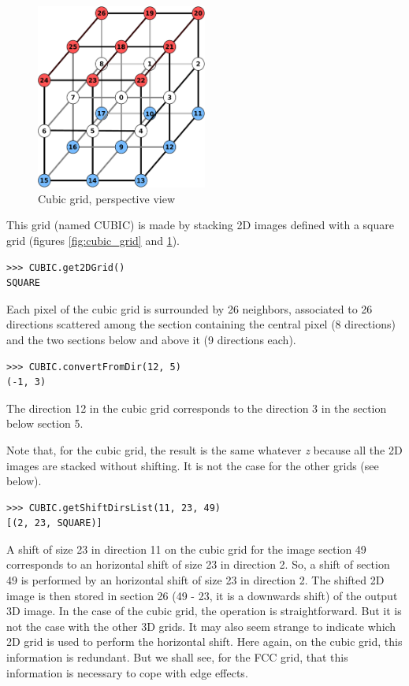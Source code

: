 \documentclass[a4paper,10pt,oneside]{article}
\begin{document}
\begin{figure}
\centering
\includegraphics[width=0.5\textwidth]{figures/Cubic_grid_3D.pdf}
\caption{Cubic grid, perspective view}
\label{fig:cubic_grid_3D}
\end{figure}


This grid (named CUBIC) is made by stacking 2D images defined with a square grid (figures \ref{fig:cubic_grid} and \ref{fig:cubic_grid_3D}).

\lstset{language=Python}
\begin{lstlisting}
>>> CUBIC.get2DGrid()
SQUARE
\end{lstlisting}

Each pixel of the cubic grid is surrounded by 26 neighbors, associated to 26 directions scattered among the section containing the
central pixel (8 directions) and the two sections below and above it (9 directions each).

\lstset{language=Python}
\begin{lstlisting}
>>> CUBIC.convertFromDir(12, 5)
(-1, 3)
\end{lstlisting}

The direction 12 in the cubic grid corresponds to the direction 3 in the section below section 5.

Note that, for the cubic grid, the result is the same whatever \emph{z} because all the 2D images are stacked without shifting. It is
not the case for the other grids (see below).

\lstset{language=Python}
\begin{lstlisting}
>>> CUBIC.getShiftDirsList(11, 23, 49)
[(2, 23, SQUARE)]
\end{lstlisting}
 
A shift of size 23 in direction 11 on the cubic grid for the image section 49 corresponds to an horizontal shift of size 23 in
direction 2. So, a shift of section 49 is performed by an horizontal shift of size 23 in direction 2. The shifted 2D image is then stored
in section 26 (49 - 23, it is a downwards shift) of the output 3D image. In the case of the cubic grid, the operation is straightforward.
But it is not the case with the other 3D grids. It may also seem strange to
indicate which 2D grid is used to perform the horizontal shift. Here again, on the cubic grid, this information is redundant. But
we shall see, for the FCC grid, that this information is necessary to cope with edge effects.
  
\end{document}
